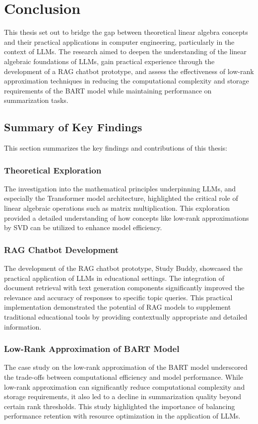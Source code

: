 \chapter{Conclusion}
This thesis set out to bridge the gap between theoretical linear algebra concepts and their practical applications in computer engineering, particularly in the context of LLMs. The research aimed to deepen the understanding of the linear algebraic foundations of LLMs, gain practical experience through the development of a RAG chatbot prototype, and assess the effectiveness of low-rank approximation techniques in reducing the computational complexity and storage requirements of the BART model while maintaining performance on summarization tasks.

\section{Summary of Key Findings}
This section summarizes the key findings and contributions of this thesis:
\subsection{Theoretical Exploration}
The investigation into the mathematical principles underpinning LLMs, and especially the Transformer model architecture, highlighted the critical role of linear algebraic operations such as matrix multiplication. This exploration provided a detailed understanding of how concepts like low-rank approximations by SVD can be utilized to enhance model efficiency.

\subsection{RAG Chatbot Development}
The development of the RAG chatbot prototype, Study Buddy, showcased the practical application of LLMs in educational settings. The integration of document retrieval with text generation components significantly improved the relevance and accuracy of responses to specific topic queries. This practical implementation demonstrated the potential of RAG models to supplement traditional educational tools by providing contextually appropriate and detailed information.

\subsection{Low-Rank Approximation of BART Model}
The case study on the low-rank approximation of the BART model underscored the trade-offs between computational efficiency and model performance. While low-rank approximation can significantly reduce computational complexity and storage requirements, it also led to a decline in summarization quality beyond certain rank thresholds. This study highlighted the importance of balancing performance retention with resource optimization in the application of LLMs.

